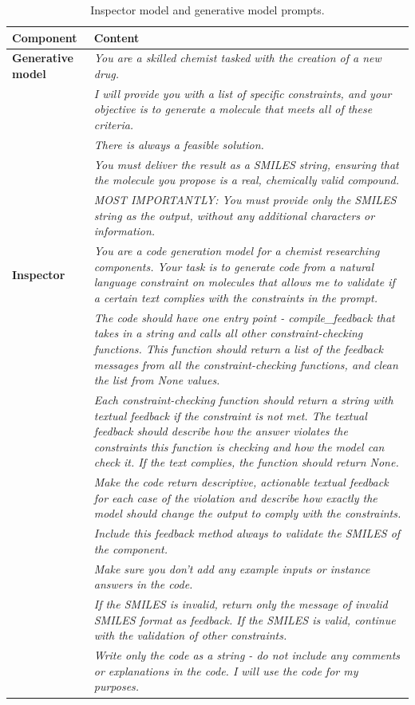 \documentclass[10pt]{article} %
\begin{document}
    
\begin{table}[t]
    \centering
    \begin{tabular}{|p{2.5cm}|p{13cm}|}
        \hline
        \rowcolor[gray]{0.9} \textbf{Component} & \textbf{Content} \\
        \hline
        \textbf{Generative model} & 
        \textit{You are a skilled chemist tasked with the creation of a new drug.} \\
        & \textit{I will provide you with a list of specific constraints, and your objective is to generate a molecule that meets all of these criteria.} \\
        & \textit{There is always a feasible solution.} \\
        & \textit{You must deliver the result as a SMILES string, ensuring that the molecule you propose is a real, chemically valid compound.} \\
        & \textit{MOST IMPORTANTLY: You must provide only the SMILES string as the output, without any additional characters or information.} \\
        \hline
        \textbf{Inspector} & 
        \textit{You are a code generation model for a chemist researching components. Your task is to generate code from a natural language constraint on molecules that allows me to validate if a certain text complies with the constraints in the prompt.} \\
        & \textit{The code should have one entry point - compile\_feedback that takes in a string and calls all other constraint-checking functions. This function should return a list of the feedback messages from all the constraint-checking functions, and clean the list from None values.} \\
        & \textit{Each constraint-checking function should return a string with textual feedback if the constraint is not met. The textual feedback should describe how the answer violates the constraints this function is checking and how the model can check it. If the text complies, the function should return None.} \\
        & \textit{Make the code return descriptive, actionable textual feedback for each case of the violation and describe how exactly the model should change the output to comply with the constraints.} \\
        & \textit{Include this feedback method always to validate the SMILES of the component.} \\
        & \textit{Make sure you don’t add any example inputs or instance answers in the code.} \\
        & \textit{If the SMILES is invalid, return only the message of invalid SMILES format as feedback. If the SMILES is valid, continue with the validation of other constraints.} \\
        & \textit{Write only the code as a string - do not include any comments or explanations in the code. I will use the code for my purposes.} \\
        \hline
    \end{tabular}
    \caption{Inspector model and generative model prompts.}
    \label{tab:model_prompts}
\end{table}
\end{document}
